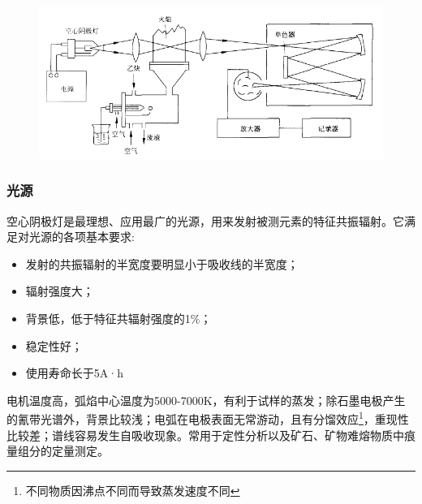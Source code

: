 \begin{figure}[!h]
	\centering
	\includegraphics[width=0.7\linewidth]{image/chp8_instrument}
	\label{fig:chp8instrument}
\end{figure}

\subsubsection{光源}
空心阴极灯是最理想、应用最广的光源，用来发射被测元素的特征共振辐射。它满足对光源的各项基本要求:
\begin{itemize}
	\item 发射的共振辐射的半宽度要明显小于吸收线的半宽度；
	\item 辐射强度大；
	\item 背景低，低于特征共辐射强度的1\%；
	\item 稳定性好；
	\item 使用寿命长于5A·h
\end{itemize}




电机温度高，弧焰中心温度为5000-7000K，有利于试样的蒸发；除石墨电极产生的氰带光谱外，背景比较浅；电弧在电极表面无常游动，且有分馏效应\footnote{不同物质因沸点不同而导致蒸发速度不同}，重现性比较差；谱线容易发生自吸收现象。常用于定性分析以及矿石、矿物难熔物质中痕量组分的定量测定。




